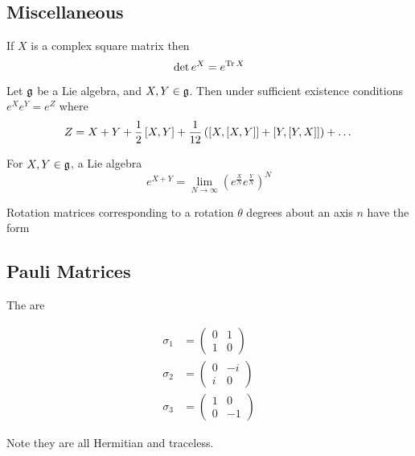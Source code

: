 \documentclass{article}
\begin{document}
\subsection{Miscellaneous}
\begin{theorem}
If $X$ is a complex square matrix then 
\[
\det{e^X}=e^{\tr{X}}
\]
\end{theorem}

\begin{theorem}
Let $\mf{g}$ be a Lie algebra, and $X,Y\in\mf{g}$. Then under sufficient existence conditions $e^X e^Y=e^Z$ where
\[
Z=X+Y+\frac{1}{2}\comm[X]{Y}+\frac{1}{12}\left(\comm[X]{\comm[X]{Y}}+\comm[Y]{\comm[Y]{X}}\right)+\dots
\]
\end{theorem}

\begin{corollary}
For $X,Y\in\mf{g}$, a Lie algebra
\[
e^{X+Y}=\lim_{N\to\infty}\left( e^{\frac{X}{N}} e^{\frac{Y}{N}} \right)^N
\]
\end{corollary}

\begin{fact}
Rotation matrices corresponding to a rotation $\theta$ degrees about an axis $n$ have the form 
\end{fact}
\subsection{Pauli Matrices}

\begin{definition}
The  are

\begin{align*}
\sigma_1 &= \begin{pmatrix} 0 & 1 \\ 1 & 0\end{pmatrix}  \\
\sigma_2 &= \begin{pmatrix} 0 & -i \\ i & 0\end{pmatrix}  \\
\sigma_3 &= \begin{pmatrix} 1 & 0 \\ 0 & -1\end{pmatrix}  
\end{align*}

Note they are all Hermitian and traceless.
\end{definition}
\end{document}
